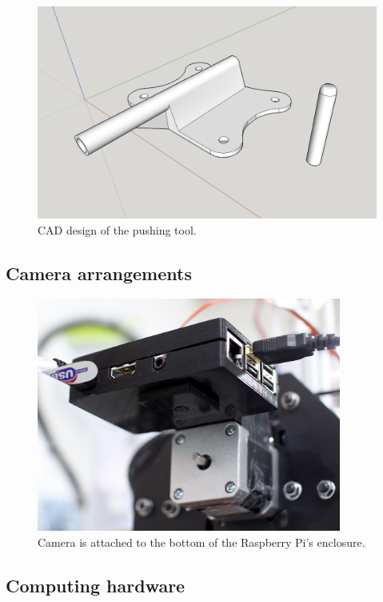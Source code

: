 \begin{figure}[ht]
  \begin{center}
    \includegraphics[width=12cm]{images/pushing_tool.png}
    \caption{CAD design of the pushing tool.}
    \label{fig:pushing_tool}
  \end{center}
\end{figure}
\FloatBarrier

\subsection{Camera arrangements}
\label{subsection:Camera Arrangements}

\begin{figure}[ht]
  \begin{center}
    \includegraphics[width=10cm]{images/camera.jpg}
    \caption{Camera is attached to the bottom of the Raspberry Pi's enclosure.}
    \label{fig:invalid_pin_test}
  \end{center}
\end{figure}
\FloatBarrier

\subsection{Computing hardware}
\label{subsection:Computing hardware}

